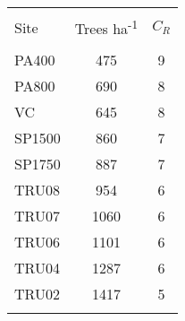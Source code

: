 
\begin{table}[!htbp] \centering 
  \caption{} 
  \label{comp_radius} 
\begin{tabular}{@{\extracolsep{5pt}} lS[table-format=3.2]S[table-format=3.2]} 
\\[-1.8ex]\hline 
\hline \\[-1.8ex] 
{Site} & {Trees ha\textsuperscript{-1}} & {$C_R$} \\
\hline \\[-1.8ex] 
PA400 & 475 & 9 \\ 
PA800 & 690 & 8 \\ 
VC & 645 & 8 \\ 
SP1500 & 860 & 7 \\ 
SP1750 & 887 & 7 \\ 
TRU08 & 954 & 6 \\ 
TRU07 & 1060 & 6 \\ 
TRU06 & 1101 & 6 \\ 
TRU04 & 1287 & 6 \\ 
TRU02 & 1417 & 5 \\ 
\hline \\[-1.8ex] 
\end{tabular} 
\end{table} 
